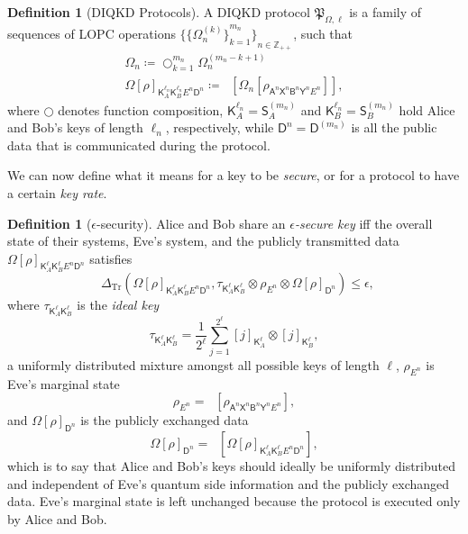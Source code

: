 \documentclass[10pt, a4paper]{article}
\numberwithin{equation}{section} %
\newcounter{stmt} %
\theoremstyle{definition}
\newtheorem{defn}[stmt]{Definition}
\theoremstyle{plain}
\newcommand{\?}{\mathrel{?}} %
\newcommand{\Z}{\mathbb{Z}} %
\newcommand{\Tr}[2][]{\mathop{\mathrm{Tr}#1}\left[ #2 \right]} %
\newcommand{\Trdist}[2]{\mathop{}\Delta_\mathrm{Tr}\left(#1, #2\right)}
\newcommand{\crv}[1]{\mathsf{#1}}
\newcommand{\proj}[2][]{{[#2]}_{#1}}
\newcommand{\proto}[2][_{\Omega,\ell}]{\mathfrak{#2}#1}
\begin{document}
    \begin{defn}[DIQKD Protocols]
      A DIQKD protocol \(\proto{P}\) is a family of sequences of LOPC operations \({\{{\{\Omega^{(k)}_{n}\}}_{k=1}^{m_n}\}}_{n\in\Z_{++}}\), such that
      \begin{gather}
        \Omega_n \coloneqq \bigcirc_{k=1}^{m_n} \Omega^{(m_n - k + 1)}_{n} \\
        {\Omega[\rho]}_{\crv{K}_{A}^{\ell_n} \crv{K}_{B}^{\ell_n} E^n \crv{D}^n} \coloneqq \Tr[_{\crv{D}^{(m_n)}_A \crv{D}^{(m_n)}_B}]{ \Omega_n \left[ \rho_{\crv{A}^n\crv{X}^n \crv{B}^n\crv{Y}^n E^n} \right] },
      \end{gather}
      where \(\bigcirc\) denotes function composition, \(\crv{K}_{A}^{\ell_n} = \crv{S}_{A}^{(m_n)}\) and \(\crv{K}_{B}^{\ell_n} = \crv{S}_{B}^{(m_n)}\) hold Alice and Bob's keys of length \(\ell_n\), respectively, while \(\crv{D}^n = \crv{D}^{(m_n)}\) is all the public data that is communicated during the protocol.
    \end{defn}

    We can now define what it means for a key to be \emph{secure}, or for a protocol to have a certain \emph{key rate}.

    \begin{defn}[\(\epsilon\)-security]
    Alice and Bob share an \emph{\(\epsilon\)-secure key} iff the overall state of their systems, Eve's system, and the publicly transmitted data \({\Omega[\rho]}_{\crv{K}_{A}^{\ell} \crv{K}_{B}^{\ell} E^n \crv{D}^n}\) satisfies
      \begin{equation}
        \Trdist{{\Omega[\rho]}_{\crv{K}_{A}^{\ell} \crv{K}_{B}^{\ell} E^n \crv{D}^n}}{\tau_{\crv{K}_{A}^{\ell} \crv{K}_{B}^{\ell}} \otimes \rho_{E^n} \otimes {\Omega[\rho]}_{\crv{D}^n}} \leq \epsilon,
      \end{equation}
      where \(\tau_{\crv{K}_{A}^{\ell} \crv{K}_{B}^{\ell}}\) is the \emph{ideal key}
      \begin{equation}
        \tau_{\crv{K}_{A}^{\ell} \crv{K}_{B}^{\ell}} = \frac{1}{2^{\ell}} \sum_{j=1}^{2^{\ell}} \proj[\crv{K}_{A}^{\ell}]{j} \otimes \proj[\crv{K}_{B}^{\ell}]{j},
      \end{equation}
      a uniformly distributed mixture amongst all possible keys of length \(\ell\), \(\rho_{E^n}\) is Eve's marginal state
      \begin{equation}
        \rho_{E^n} = \Tr[_{\crv{A}^n\crv{X}^n \crv{B}^n\crv{Y}^n}]{ \rho_{\crv{A}^n\crv{X}^n \crv{B}^n\crv{Y}^n E^n} },
      \end{equation}
      and \({\Omega[\rho]}_{\crv{D}^n}\) is the publicly exchanged data
      \begin{equation}
        {\Omega[\rho]}_{\crv{D}^n} = \Tr[_{\crv{K}_{A}^{\ell} \crv{K}_{B}^{\ell} E^n}]{ {\Omega[\rho]}_{\crv{K}_{A}^{\ell} \crv{K}_{B}^{\ell} E^n \crv{D}^n} },
      \end{equation} 
      which is to say that Alice and Bob's keys should ideally be uniformly distributed and independent of Eve's quantum side information and the publicly exchanged data. Eve's marginal state is left unchanged because the protocol is executed only by Alice and Bob.
    \end{defn}
\end{document}
